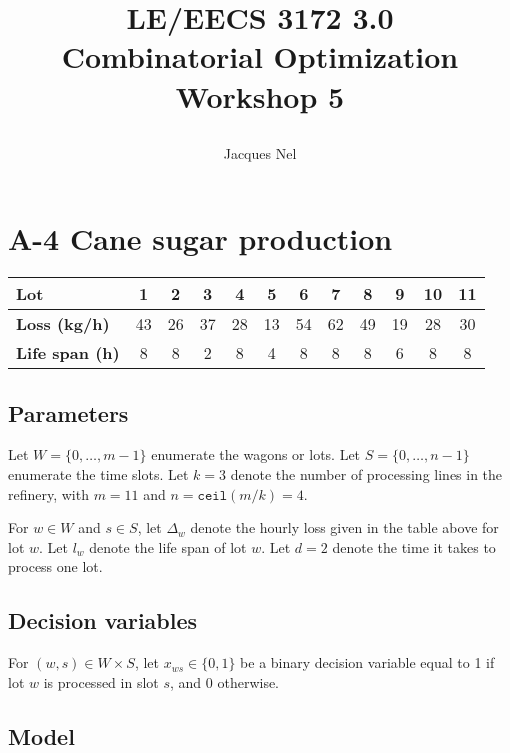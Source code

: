 \documentclass[11pt,oneside]{article}
\title{{\bf LE/EECS 3172 3.0\\ Combinatorial Optimization}\\\vspace{10pt} \large Workshop 5     
    \author{Jacques Nel}
}
\begin{document}
\maketitle

\newpage

\section{A-4 Cane sugar production}

\begin{table}[h]
    \center
    \begin{tabular}{lccccccccccc}
        \hline
        \textbf{Lot} & 1 & 2 & 3 & 4 & 5 & 6 & 7 & 8 & 9 & 10 & 11 \\
        \hline
        \textbf{Loss (kg/h)} & 43 & 26 & 37 & 28 & 13 & 54 & 62 & 49 & 19 & 28 & 30 \\
            \textbf{Life span (h)} & 8 & 8 & 2 & 8 & 4 & 8 & 8 & 8 & 6 & 8 & 8 \\
        \hline
    \end{tabular}
\end{table}

\subsection{Parameters}

Let $W = \lbrace 0,\ldots, m-1\rbrace$ enumerate the wagons or lots. Let
$S = \lbrace 0, \ldots, n-1\rbrace$ enumerate the time slots. Let $k=3$ denote
the number of processing lines in the refinery, with $m=11$ and
$n=\texttt{ceil}(m/k) = 4$.

For $w\in W$ and $s\in S$, let $\Delta_{w}$ denote the hourly loss given in the
table above for lot $w$. Let $l_{w}$ denote the life span of lot $w$. Let
$d=2$ denote the time it takes to process one lot.

\subsection{Decision variables}

For $(w, s) \in W\times S$, let $x_{ws}\in\lbrace 0, 1\rbrace$ be a binary
decision variable equal to 1 if lot $w$ is processed in slot $s$, and 0
otherwise.

\subsection{Model}
\end{document}
